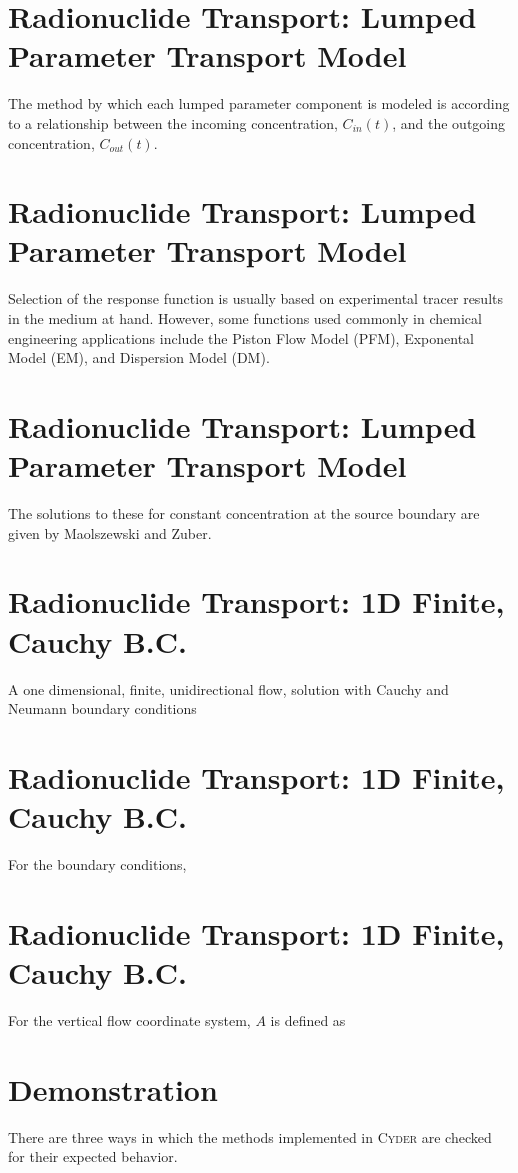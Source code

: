 \documentclass[letterpaper]{article}
\newcommand{\Cyder}{\textsc{Cyder}\xspace}
\begin{document}
{  \section{Radionuclide Transport: Lumped Parameter Transport Model}
The method by which each lumped parameter component is modeled is
according to a relationship between the incoming concentration, $C_{in}(t)$,
and the outgoing concentration, $C_{out}(t)$.

  \section{Radionuclide Transport: Lumped Parameter Transport Model}
Selection of the response function is usually based on experimental tracer
results in the medium at hand. However, some functions used commonly in
chemical engineering applications \cite{maloszewski_lumped_1996} include the
Piston Flow Model (PFM), Exponental Model (EM), and Dispersion Model (DM). 

  \section{Radionuclide Transport: Lumped Parameter Transport Model}
The solutions to these for constant concentration at the 
source boundary are given by Maolszewski and Zuber.

  \section{Radionuclide Transport: 1D Finite, Cauchy B.C.}
  A one dimensional, finite, unidirectional flow,
  solution with Cauchy and Neumann boundary conditions

  \section{Radionuclide Transport: 1D Finite, Cauchy B.C.}
For the boundary conditions, 

  \section{Radionuclide Transport: 1D Finite, Cauchy B.C.}
For the vertical flow coordinate system, $A$ is defined as

\section{Demonstration}
There are three ways in which the methods implemented in \Cyder are checked for 
their expected behavior. 

}
\end{document}
